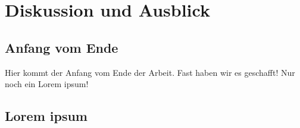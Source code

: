 \chapter{Diskussion und Ausblick}

\section{Anfang vom Ende}

Hier kommt der Anfang vom Ende der Arbeit.
Fast haben wir es geschafft! Nur noch ein Lorem ipsum!

\section{Lorem ipsum}

\lipsum